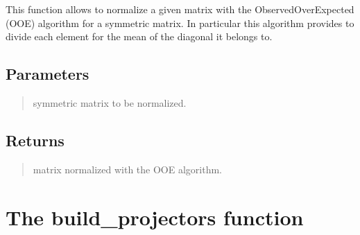 \documentclass[letterpaper,10pt,english]{sphinxmanual}
\begin{document}
\begin{fulllineitems}
\label{\detokenize{index:hicanalysis.preprocessing.ooe_normalization}}
\pysigstartsignatures
{}
\pysigstopsignatures
\sphinxAtStartPar
This function allows to normalize a given matrix with the Observed\sphinxhyphen{}Over\sphinxhyphen{}Expected (OOE) 
algorithm for a symmetric matrix. In particular this algorithm provides to divide each 
element for the mean of the diagonal it belongs to.


\subsection{Parameters}
\label{\detokenize{index:id7}}\begin{quote}
\begin{description}
\sphinxAtStartPar
symmetric matrix to be normalized.

\end{description}
\end{quote}


\subsection{Returns}
\label{\detokenize{index:id8}}\begin{quote}
\begin{description}
\sphinxAtStartPar
matrix normalized with the OOE algorithm.

\end{description}
\end{quote}

\end{fulllineitems}



\section{The build\_projectors function}
\label{\detokenize{index:the-build-projectors-function}}
\end{document}
